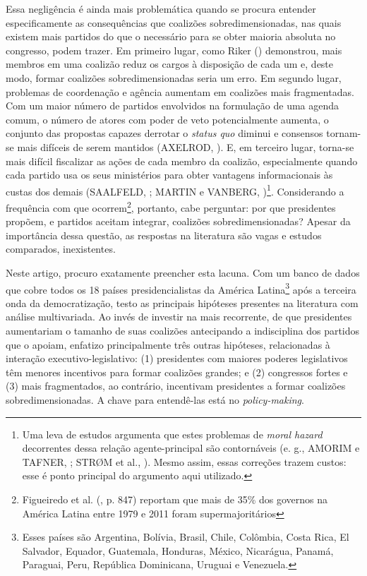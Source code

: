 Essa negligência é ainda mais problemática quando se procura entender especificamente as consequências que coalizões sobredimensionadas, nas quais existem mais partidos do que o necessário para se obter maioria absoluta no congresso, podem trazer. Em primeiro lugar, como Riker (\citeyear{riker1962}) demonstrou, mais membros em uma coalizão reduz os cargos à disposição de cada um e, deste modo, formar coalizões sobredimensionadas seria um erro. Em segundo lugar, problemas de coordenação e agência aumentam em coalizões mais fragmentadas. Com um maior número de partidos envolvidos na formulação de uma agenda comum, o número de atores com poder de veto potencialmente aumenta, o conjunto das propostas capazes derrotar o \textit{status quo} diminui e consensos tornam-se mais difíceis de serem mantidos (AXELROD, \citeyear{axelrod1970}). E, em terceiro lugar, torna-se mais difícil fiscalizar as ações de cada membro da coalizão, especialmente quando cada partido usa os seus ministérios para obter vantagens informacionais às custas dos demais (SAALFELD, \citeyear{saalfeld2000}; MARTIN e VANBERG, \citeyear{martin2011})\footnote{Uma leva de estudos argumenta que estes problemas de \textit{moral hazard} decorrentes dessa relação agente-principal são contornáveis (e. g., AMORIM e TAFNER, \citeyear{neto2002}; STR\O{}M et al., \citeyear{strom2010}). Mesmo assim, essas correções trazem custos: esse é ponto principal do argumento aqui utilizado.}. Considerando a frequência com que ocorrem\footnote{Figueiredo et al. (\citeyear{figueiredo2012}, p. 847) reportam que mais de 35\% dos governos na América Latina entre 1979 e 2011 foram supermajoritários}, portanto, cabe perguntar: por que presidentes propõem, e partidos aceitam integrar, coalizões sobredimensionadas? Apesar da importância dessa questão, as respostas na literatura são vagas e estudos comparados, inexistentes.
 
Neste artigo, procuro exatamente preencher esta lacuna. Com um banco de dados que cobre todos os 18 países presidencialistas da América Latina\footnote{Esses países são Argentina, Bolívia, Brasil, Chile, Colômbia, Costa Rica, El Salvador, Equador, Guatemala, Honduras, México, Nicarágua, Panamá, Paraguai, Peru, República Dominicana, Uruguai e Venezuela.} após a terceira onda da democratização, testo as principais hipóteses presentes na literatura com análise multivariada. Ao invés de investir na mais recorrente, de que presidentes aumentariam o tamanho de suas coalizões antecipando a indisciplina dos partidos que o apoiam, enfatizo principalmente três outras hipóteses, relacionadas à interação executivo-legislativo: (1) presidentes com maiores poderes legislativos têm menores incentivos para formar coalizões grandes; e (2) congressos fortes e (3) mais fragmentados, ao contrário, incentivam presidentes a formar coalizões sobredimensionadas. A chave para entendê-las está no \textit{policy-making}.

